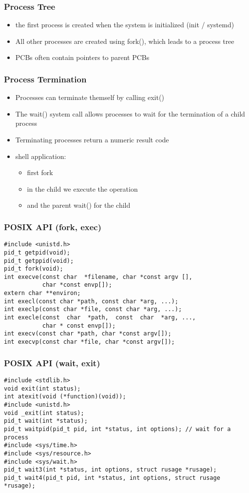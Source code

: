 \documentclass[11pt]{article}
\begin{document}
\subsubsection{Process Tree}
\label{sec:org8d9c0cc}
\begin{itemize}
\item the first process is created when the system is initialized (init / systemd)
\item All other processes are created using fork(), which leads to a process tree
\item PCBs often contain pointers to parent PCBs
\end{itemize}
\subsubsection{Process Termination}
\label{sec:org621a66a}
\begin{itemize}
\item Processes can terminate themself by calling exit()
\item The wait() system call allows processes to wait for the termination of a child process
\item Terminating processes return a numeric result code
\item shell application:
\begin{itemize}
\item first fork
\item in the child we execute the operation
\item and the parent wait() for the child
\end{itemize}
\end{itemize}
\subsubsection{POSIX API (fork, exec)}
\label{sec:orga576998}
\begin{verbatim}
#include <unistd.h>
pid_t getpid(void);
pid_t getppid(void);
pid_t fork(void);
int execve(const char  *filename, char *const argv [],
           char *const envp[]);
extern char **environ;
int execl(const char *path, const char *arg, ...);
int execlp(const char *file, const char *arg, ...);
int execle(const  char  *path,  const  char  *arg, ...,
           char * const envp[]);
int execv(const char *path, char *const argv[]);
int execvp(const char *file, char *const argv[]);
\end{verbatim}
\subsubsection{POSIX API (wait, exit)}
\label{sec:org1903395}
\begin{verbatim}
#include <stdlib.h>
void exit(int status);
int atexit(void (*function)(void));
#include <unistd.h>
void _exit(int status);
pid_t wait(int *status);
pid_t waitpid(pid_t pid, int *status, int options); // wait for a process
#include <sys/time.h>
#include <sys/resource.h>
#include <sys/wait.h>
pid_t wait3(int *status, int options, struct rusage *rusage);
pid_t wait4(pid_t pid, int *status, int options, struct rusage *rusage);
\end{verbatim}
\end{document}
